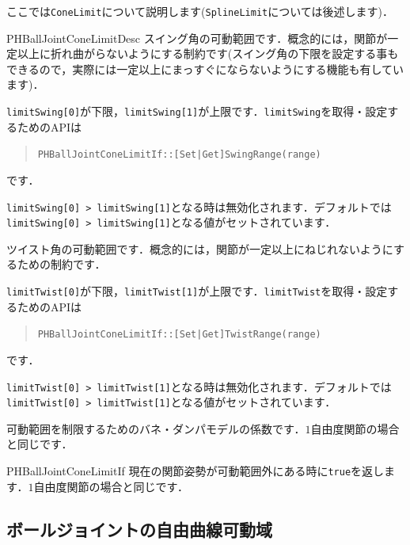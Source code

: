 \KLUDGE ここでは\texttt{ConeLimit}について説明します(\texttt{SplineLimit}については後述します)．

\begin{reference}{PHBallJointConeLimitDesc}
\KLUDGE スイング角の可動範囲です．概念的には，関節が一定以上に折れ曲がらないようにする制約です(スイング角の下限を設定する事もできるので，実際には一定以上にまっすぐにならないようにする機能も有しています)．

\texttt{limitSwing[0]}が下限，\texttt{limitSwing[1]}が上限です．\texttt{limitSwing}を取得・設定するためのAPIは
\begin{quote}
\texttt{PHBallJointConeLimitIf::[Set|Get]SwingRange(range)}
\end{quote}
\KLUDGE です．

\texttt{limitSwing[0] > limitSwing[1]}となる時は無効化されます．デフォルトでは\texttt{limitSwing[0] > limitSwing[1]}となる値がセットされています．

\KLUDGE ツイスト角の可動範囲です．概念的には，関節が一定以上にねじれないようにするための制約です．

\texttt{limitTwist[0]}が下限，\texttt{limitTwist[1]}が上限です．\texttt{limitTwist}を取得・設定するためのAPIは
\begin{quote}
\texttt{PHBallJointConeLimitIf::[Set|Get]TwistRange(range)}
\end{quote}
\KLUDGE です．

\texttt{limitTwist[0] > limitTwist[1]}となる時は無効化されます．デフォルトでは\texttt{limitTwist[0] > limitTwist[1]}となる値がセットされています．

 \Plus
{}
\KLUDGE 可動範囲を制限するためのバネ・ダンパモデルの係数です．$1$自由度関節の場合と同じです．
\end{reference}

\begin{reference}{PHBallJointConeLimitIf}
\KLUDGE 現在の関節姿勢が可動範囲外にある時に\texttt{true}を返します．$1$自由度関節の場合と同じです．
\end{reference}



\KLUDGE %
\subsection*{ボールジョイントの自由曲線可動域} \label{sec_splinelimit}





